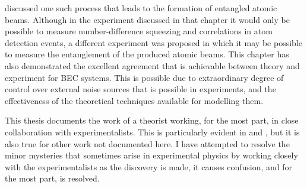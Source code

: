  discussed one such process that leads to the formation of entangled atomic beams.  Although in the experiment discussed in that chapter it would only be possible to measure number-difference squeezing and correlations in atom detection events, a different experiment was proposed in which it may be possible to measure the entanglement of the produced atomic beams.  This chapter has also demonstrated the excellent agreement that is achievable between theory and experiment for BEC systems.  This is possible due to extraordinary degree of control over external noise sources that is possible in experiments, and the effectiveness of the theoretical techniques available for modelling them.

\parasep

This thesis documents the work of a theorist working, for the most part, in close collaboration with experimentalists.  This is particularly evident in  and , but it is also true for other work not documented here.  I have attempted to resolve the minor mysteries that sometimes arise in experimental physics by working closely with the experimentalists as the discovery is made, it causes confusion, and for the most part, is resolved.






